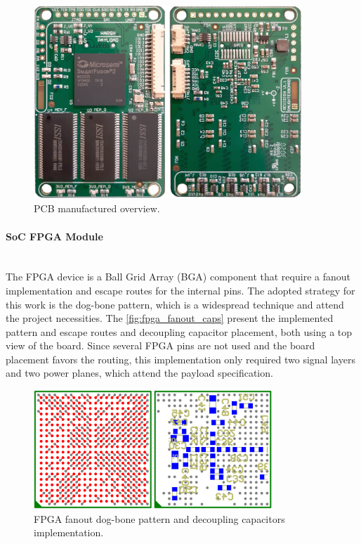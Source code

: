\begin{figure}[!ht]
    \begin{center}
        \includegraphics[width=0.9\textwidth]{figures/harsh_pcb_preview_real.jpeg}
        \caption{PCB manufactured overview.}
        \label{fig:harsh_pcb_preview_real}
    \end{center}
\end{figure}

\paragraph{SoC FPGA Module} \mbox{}\\

The FPGA device is a Ball Grid Array (BGA) component that require a fanout implementation and escape routes for the internal pins. The adopted strategy for this work is the dog-bone pattern, which is a widespread technique and attend the project necessities. The \autoref{fig:fpga_fanout_caps} present the implemented pattern and escape routes and decoupling capacitor placement, both using a top view of the board. Since several FPGA pins are not used and the board placement favors the routing, this implementation only required two signal layers and two power planes, which attend the payload specification.

\begin{figure}[!ht]
    \begin{center}
        \includegraphics[width=0.8\textwidth]{figures/fpga_fanout_caps.png}
        \caption{FPGA fanout dog-bone pattern and decoupling capacitors implementation.}
        \label{fig:fpga_fanout_caps}
    \end{center}
\end{figure}


